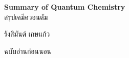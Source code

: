 

{
\thispagestyle{empty}

\begin{center}
    \vspace*{1.0in}
    
    \begin{spacing}{3}
    {\Huge \textbf{ Summary of Quantum Chemistry }}\\
    {\LARGE สรุปเคมีควอนตัม}
    \end{spacing}
    
    \vspace{1.0in}
    
    {\LARGE  รังสิมันต์ เกษแก้ว}
    
    \vspace{1.5in}
    
    {\LARGE ฉบับอ่านก่อนนอน}
    \vspace{0.5in}
    
    \vfill
\end{center}
}
